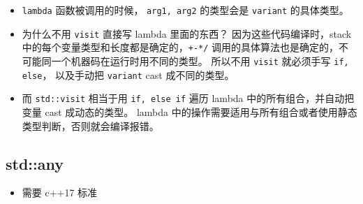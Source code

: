 \begin{itemize}
\item \verb|lambda| 函数被调用的时候， \verb|arg1, arg2| 的类型会是 \verb|variant| 的具体类型。
\item 为什么不用 \verb`visit` 直接写 lambda 里面的东西？ 因为这些代码编译时，stack 中的每个变量类型和长度都是确定的，\verb|+-*/| 调用的具体算法也是确定的，不可能同一个机器码在运行时用不同的类型。 所以不用 \verb|visit| 就必须手写 \verb|if, else|， 以及手动把 \verb|variant| cast 成不同的类型。
\item 而 \verb|std::visit| 相当于用 \verb|if, else if| 遍历 lambda 中的所有组合，并自动把变量 cast 成动态的类型。 lambda 中的操作需要适用与所有组合或者使用静态类型判断，否则就会编译报错。
\end{itemize}

\subsection{std::any}
\begin{itemize}
\item 需要 c++17 标准
\end{itemize}
